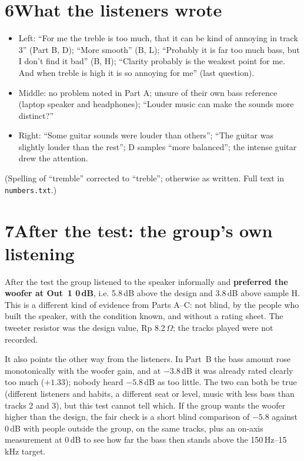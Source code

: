 \documentclass[11pt,a4paper]{article}
\begin{document}
\section*{6\quad What the listeners wrote}
\begin{itemize}\setlength{\itemsep}{1pt}
\item Left: ``For me the treble is too much, that it can be kind of annoying in track 3'' (Part B, D);
``More smooth'' (B, L); ``Probably it is far too much bass, but I don't find it bad'' (B, H);
``Clarity probably is the weakest point for me. And when treble is high it is so annoying for me'' (last question).
\item Middle: no problem noted in Part A; unsure of their own bass reference (laptop speaker and headphones);
``Louder music can make the sounds more distinct?''
\item Right: ``Some guitar sounds were louder than others''; ``The guitar was slightly louder than the rest'';
D samples ``more balanced''; the intense guitar drew the attention.
\end{itemize}
(Spelling of ``tremble'' corrected to ``treble''; otherwise as written. Full text in \texttt{numbers.txt}.)

\section*{7\quad After the test: the group's own listening}
After the test the group listened to the speaker informally and \textbf{preferred the woofer at Out~1
0\,dB}, i.e. 5.8\,dB above the design and 3.8\,dB above sample H. This is a different kind of evidence from
Parts A--C: not blind, by the people who built the speaker, with the condition known, and without a rating
sheet. The tweeter resistor was the design value, Rp 8.2\,$\Omega$; the tracks played were not recorded.

It also points the other way from the listeners. In Part~B the bass amount rose monotonically with the
woofer gain, and at $-3.8$\,dB it was already rated clearly too much ($+1.33$); nobody heard $-5.8$\,dB as
too little. The two can both be true (different listeners and habits, a different seat or level, music with
less bass than tracks 2 and 3), but this test cannot tell which. If the group wants the woofer higher than
the design, the fair check is a short blind comparison of $-5.8$ against 0\,dB with people outside the group,
on the same tracks, plus an on-axis measurement at 0\,dB to see how far the bass then stands above the
150\,Hz--15\,kHz target.
\end{document}
